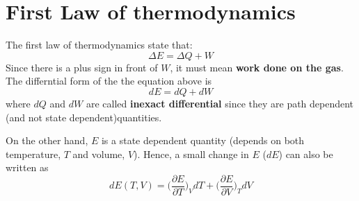 \section{First Law of thermodynamics}
The first law of thermodynamics state that:
\begin{equation}
    \Delta E= \Delta Q + W
\end{equation}
Since there is a plus sign in front of $W$, it must mean \textbf{work done on the gas}.
The differntial form of the the equation above is
\begin{equation}
    dE=dQ+dW
\end{equation}
where $dQ$ and $dW$ are called \textbf{inexact differential} since they are path dependent (and not state dependent)quantities.

On the other hand, $E$ is a state dependent quantity (depends on both temperature, $T$ and volume, $V$). Hence, a small change in $E$ ($dE$) can also be written as
\begin{equation}
    dE(T,V)=\bigg(\frac{\partial E}{\partial T}\bigg)_V dT+\bigg(\frac{\partial E}{\partial V}\bigg)_T dV
\end{equation}
